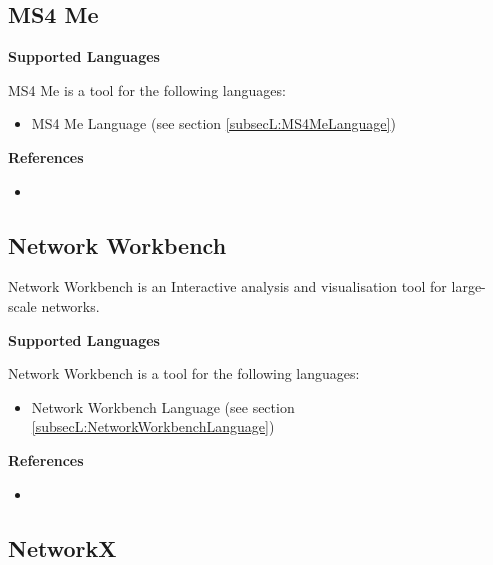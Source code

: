 \subsection{MS4 Me}
\label{subsecT:MS4MeTool}



\textbf{Supported Languages}

MS4 Me is a tool for the following languages:
\begin{itemize}
	\item MS4 Me Language (see section \ref{subsecL:MS4MeLanguage})
\end{itemize}


\textbf{References}
\begin{itemize}
	
\item {}
\end{itemize}



\subsection{Network Workbench}
\label{subsecT:NetworkWorkbench}


Network Workbench is an Interactive analysis and visualisation tool for large-scale networks.

\textbf{Supported Languages}

Network Workbench is a tool for the following languages:
\begin{itemize}
	\item Network Workbench Language (see section \ref{subsecL:NetworkWorkbenchLanguage})
\end{itemize}


\textbf{References}
\begin{itemize}
	
\item {}
\end{itemize}



\subsection{NetworkX}
\label{subsecT:NetworkX}


